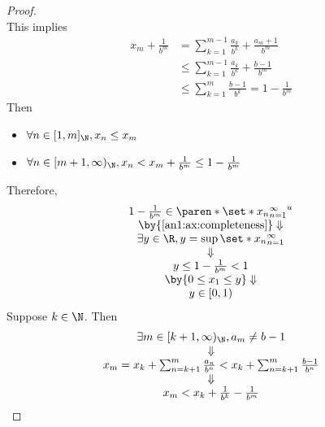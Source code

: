 \begin{proof}
\[  \]
  This implies
  \begin{align*}
    x_{m} + \frac{1}{b^{m}} & = \sum_{k = 1}^{m - 1} \frac{a_{k}}{b^{k}} + \frac{a_{m} + 1}{b^{m}} \\
                            & \leq \sum_{k = 1}^{m - 1} \frac{a_{k}}{b^{k}} + \frac{b - 1}{b^{m}}  \\
                            & \leq \sum_{k = 1}^{m} \frac{b - 1}{b^{k}} = 1 - \frac{1}{b^{m}}
  \end{align*}
  Then
  \begin{itemize}
    \item $\forall n \in [1, m]_{\N}, x_{n} \leq x_{m}$
    \item $\forall n \in [m + 1, \infty)_{\N}, x_{n} < x_{m} + \frac{1}{b^{m}} \leq 1 - \frac{1}{b^{m}}$
  \end{itemize}
  Therefore,
  \[
    \begin{array}{c}
      1 - \frac{1}{b^{m}} \in \paren*{\set*{x_{n}}_{n = 1}^{\infty}}^{u} \\
      \by{\Cref{an1:ax:completeness}} \Downarrow                         \\
      \exists y \in \R, y = \sup \set*{x_{n}}_{n = 1}^{\infty}           \\
      \Downarrow                                                         \\
      y \leq 1 - \frac{1}{b^{m}} < 1                                     \\
      \by{\ensuremath{0 \leq x_{1} \leq y}} \Downarrow                   \\
      y \in [0, 1)
    \end{array}
  \]
  Suppose $k \in \N$. Then
  \[
    \begin{array}{c}
      \exists m \in [k + 1, \infty)_{\N}, a_{m} \neq b - 1                                                        \\
      \Downarrow                                                                                                  \\
      x_{m} = x_{k} + \sum_{n = k + 1}^{m} \frac{a_{n}}{b^{n}} < x_{k} + \sum_{n = k + 1}^{m} \frac{b - 1}{b^{n}} \\
      \Downarrow                                                                                                  \\
      x_{m} < x_{k} + \frac{1}{b^{k}} - \frac{1}{b^{m}}                                                           \\

\end{array}\]
\end{proof}
